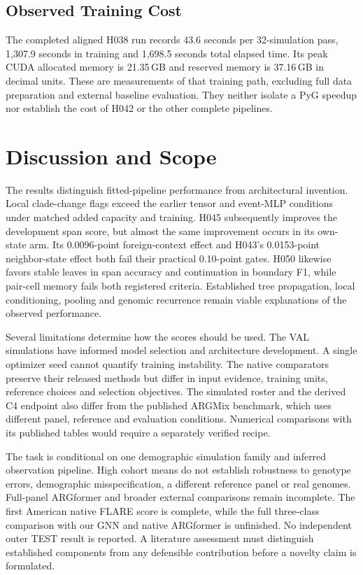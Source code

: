 \documentclass[letterpaper]{article}
\begin{document}
\subsection{Observed Training Cost}
The completed aligned H038 run records 43.6 seconds per 32-simulation pass, 1,307.9 seconds in training and 1,698.5 seconds total elapsed time. Its peak CUDA allocated memory is 21.35\,GB and reserved memory is 37.16\,GB in decimal units. These are measurements of that training path, excluding full data preparation and external baseline evaluation. They neither isolate a PyG speedup nor establish the cost of H042 or the other complete pipelines.

\section{Discussion and Scope}
The results distinguish fitted-pipeline performance from architectural invention. Local clade-change flags exceed the earlier tensor and event-MLP conditions under matched added capacity and training. H045 subsequently improves the development span score, but almost the same improvement occurs in its own-state arm. Its 0.0096-point foreign-context effect and H043's 0.0153-point neighbor-state effect both fail their practical 0.10-point gates. H050 likewise favors stable leaves in span accuracy and continuation in boundary F1, while pair-cell memory fails both registered criteria. Established tree propagation, local conditioning, pooling and genomic recurrence remain viable explanations of the observed performance.

Several limitations determine how the scores should be used. The VAL simulations have informed model selection and architecture development. A single optimizer seed cannot quantify training instability. The native comparators preserve their released methods but differ in input evidence, training units, reference choices and selection objectives. The simulated roster and the derived C4 endpoint also differ from the published ARGMix benchmark, which uses different panel, reference and evaluation conditions. Numerical comparisons with its published tables would require a separately verified recipe.

The task is conditional on one demographic simulation family and inferred observation pipeline. High cohort means do not establish robustness to genotype errors, demographic misspecification, a different reference panel or real genomes. Full-panel ARGformer and broader external comparisons remain incomplete. The first American native FLARE score is complete, while the full three-class comparison with our GNN and native ARGformer is unfinished. No independent outer TEST result is reported. A literature assessment must distinguish established components from any defensible contribution before a novelty claim is formulated.
\end{document}
